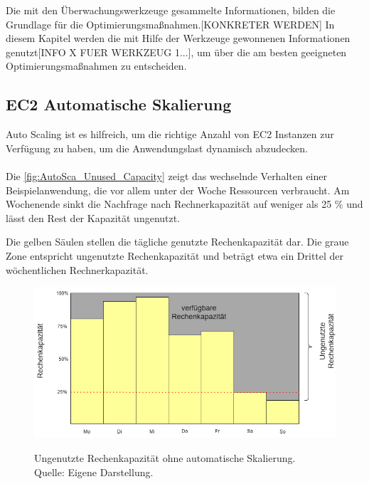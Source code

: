 
Die mit den Überwachungswerkzeuge gesammelte Informationen, bilden die Grundlage für die Optimierungsmaßnahmen.[KONKRETER WERDEN]
In diesem Kapitel werden die mit Hilfe der Werkzeuge gewonnenen Informationen genutzt[INFO X FUER WERKZEUG 1...], um über die am besten geeigneten Optimierungsmaßnahmen zu entscheiden.

\subsection{EC2 Automatische Skalierung}
Auto Scaling ist es hilfreich, um die richtige Anzahl von EC2 Instanzen zur Verfügung zu haben, um die Anwendungslast dynamisch abzudecken.
\\\\

Die \autoref{fig:AutoSca_Unused_Capacity} zeigt das wechselnde Verhalten einer Beispielanwendung, die vor allem unter der Woche Ressourcen verbraucht. Am Wochenende sinkt die Nachfrage nach Rechnerkapazität auf weniger als 25 \% und lässt den Rest der Kapazität ungenutzt. 

Die gelben Säulen stellen die tägliche genutzte Rechenkapazität dar.
Die graue Zone entspricht ungenutzte Rechenkapazität und beträgt etwa ein Drittel der wöchentlichen Rechnerkapazität. 

\begin{figure}[h]
    \centering
    \includegraphics[scale=0.5]{sources/AutoCap Unused Capacity}
    \caption[Ungenutzte Rechenkapazität ohne automatische Skalierung]{}
    \label{fig:AutoSca_Unused_Capacity} Ungenutzte Rechenkapazität ohne automatische Skalierung. \\
    Quelle: Eigene Darstellung. 
  \end{figure}

